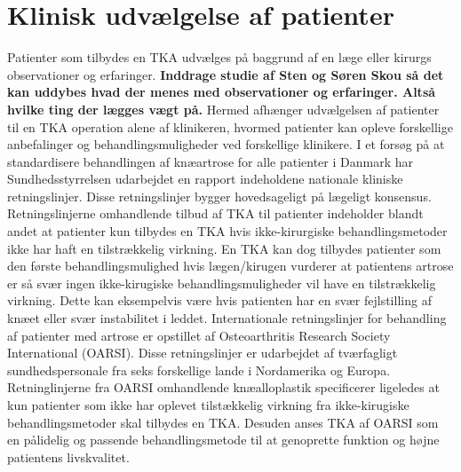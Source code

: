 \section{Klinisk udvælgelse af patienter}

Patienter som tilbydes en TKA udvælges på baggrund af en læge eller kirurgs observationer og erfaringer.
\textbf{Inddrage studie af Sten og Søren Skou så det kan uddybes hvad der menes med observationer og erfaringer. Altså hvilke ting der lægges vægt på.}
Hermed afhænger udvælgelsen af patienter til en TKA operation alene af klinikeren, hvormed patienter kan opleve forskellige anbefalinger og behandlingsmuligheder ved forskellige klinikere. I et forsøg på at standardisere behandlingen af knæartrose for alle patienter i Danmark har Sundhedsstyrrelsen udarbejdet en rapport indeholdene nationale kliniske retningslinjer. Disse retningslinjer bygger hovedsageligt på lægeligt konsensus. Retningslinjerne omhandlende tilbud af TKA til patienter indeholder blandt andet at patienter kun tilbydes en TKA hvis ikke-kirurgiske behandlingsmetoder ikke har haft en tilstrækkelig virkning. En TKA kan dog tilbydes patienter som den første behandlingsmulighed hvis lægen/kirugen vurderer at patientens artrose er så svær ingen ikke-kirugiske behandlingsmuligheder vil have en tilstrækkelig virkning. Dette kan eksempelvis være hvis patienten har en svær fejlstilling af knæet eller svær instabilitet i leddet. \citep{brostrom2012}    
Internationale retningslinjer for behandling af patienter med artrose er opstillet af Osteoarthritis Research Society International (OARSI). Disse retningslinjer er udarbejdet af tværfagligt sundhedspersonale fra seks forskellige lande i Nordamerika og Europa. Retninglinjerne fra OARSI omhandlende knæalloplastik specificerer ligeledes at kun patienter som ikke har oplevet tilstækkelig virkning fra ikke-kirugiske behandlingsmetoder skal tilbydes en TKA. Desuden anses TKA af OARSI som en pålidelig og passende behandlingsmetode til at genoprette funktion og højne patientens livskvalitet. \citep{zhang2008} \\
